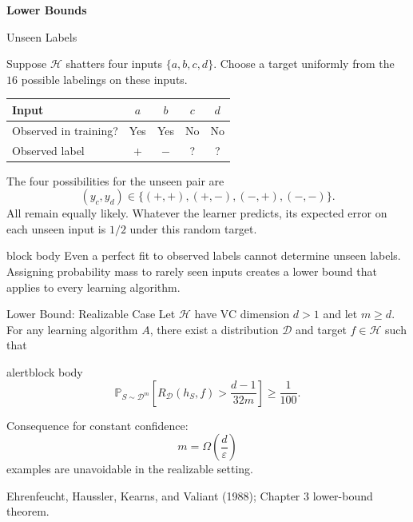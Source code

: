 \documentclass[aspectratio=169,10pt]{beamer}
\newcommand{\D}{\mathcal{D}}
\newcommand{\Hc}{\mathcal{H}}
\newcommand{\eps}{\varepsilon}
\newcommand{\Prb}{\mathbb{P}}
\newcommand{\SectionSlide}[2]{%
  \begin{frame}
    \centering
    \vfill
    {\color{slideorange}\fontsize{29}{34}\selectfont\bfseries #1\par}
    \vspace{0.38cm}
    {\color{midgray}\fontsize{16}{21}\selectfont #2\par}
    \vfill
  \end{frame}
}
\newcommand{\SourceNote}[1]{%
  \vfill
  \begin{flushright}
    {\scriptsize\color{midgray}#1}
  \end{flushright}
}
\newcommand{\KeyBox}[1]{%
  \begin{beamercolorbox}[rounded=true,sep=0.22cm,wd=\linewidth]{block body}
    #1
  \end{beamercolorbox}%
}
\begin{document}
\SectionSlide{Lower Bounds}{}

\begin{frame}[t]{Unseen Labels}
  \vspace{0.04cm}
  \small

  Suppose $\Hc$ shatters four inputs $\{a,b,c,d\}$. Choose a target
  uniformly from the $16$ possible labelings on these inputs.
  \begin{center}
  \renewcommand{\arraystretch}{1.15}
  \begin{tabular}{lcccc}
    \toprule
    Input & $a$ & $b$ & $c$ & $d$\\
    \midrule
    Observed in training? & Yes & Yes & No & No\\
    Observed label & $+$ & $-$ & ? & ?\\
    \bottomrule
  \end{tabular}
  \end{center}
  The four possibilities for the unseen pair are
  \[
    (y_c,y_d)\in\{(+,+),(+,-),(-,+),(-,-)\}.
  \]
  All remain equally likely. Whatever the learner predicts, its expected
  error on each unseen input is $1/2$ under this random target.
  \vspace{0.16cm}
  \KeyBox{Even a perfect fit to observed labels cannot determine unseen
  labels. Assigning probability mass to rarely seen inputs creates a
  lower bound that applies to every learning algorithm.}

\end{frame}

\begin{frame}[t]{Lower Bound: Realizable Case}
  \vspace{0.01cm}
  Let $\Hc$ have VC dimension $d>1$ and let $m\ge d$. For any learning algorithm $A$, there exist a distribution $\D$ and target $f\in\Hc$ such that
  \begin{beamercolorbox}[rounded=true,sep=0.18cm,wd=\linewidth]{alertblock body}
    \[
      \boxed{
      \Prb_{S\sim\D^m}\!\left[
        R_\D(h_S,f)>\frac{d-1}{32m}
      \right]\ge\frac{1}{100}.}
    \]
  \end{beamercolorbox}
  \vspace{0.10cm}
  Consequence for constant confidence:
  \[
    m=\Omega\!\left(\frac{d}{\eps}\right)
  \]
  examples are unavoidable in the realizable setting.
  \SourceNote{Ehrenfeucht, Haussler, Kearns, and Valiant (1988); Chapter 3 lower-bound theorem.}
\end{frame}
\end{document}
